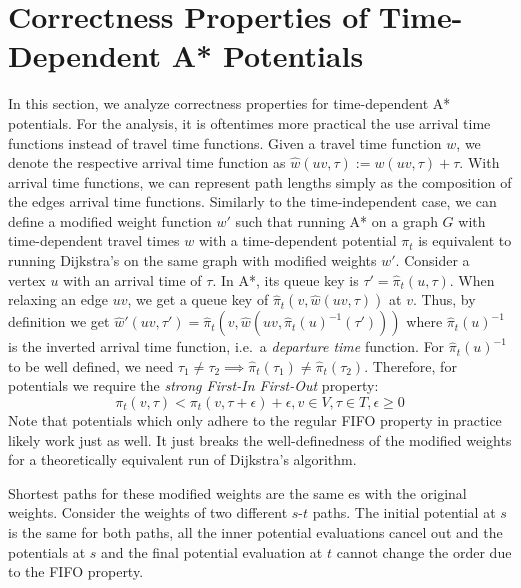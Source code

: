 \documentclass[a4paper,UKenglish,cleveref, autoref, thm-restate,anonymous]{lipics-v2021}
\begin{document}
\section{Correctness Properties of Time-Dependent A* Potentials}\label{sec:appendix:correctness}

In this section, we analyze correctness properties for time-dependent A* potentials.
For the analysis, it is oftentimes more practical the use arrival time functions instead of travel time functions.
Given a travel time function $w$, we denote the respective arrival time function as $\hat{w}(uv, \tau) := w(uv, \tau) + \tau$.
With arrival time functions, we can represent path lengths simply as the composition of the edges arrival time functions.
Similarly to the time-independent case, we can define a modified weight function $w'$ such that running A* on a graph $G$ with time-dependent travel times $w$ with a time-dependent potential $\pi_t$ is equivalent to running Dijkstra's on the same graph with modified weights $w'$.
Consider a vertex $u$ with an arrival time of $\tau$.
In A*, its queue key is $\tau' = \hat{\pi}_t(u, \tau)$.
When relaxing an edge $uv$, we get a queue key of $\hat{\pi}_t(v, \hat{w}(uv, \tau))$ at $v$.
Thus, by definition we get $\hat{w}'(uv, \tau') = \hat{\pi}_t(v, \hat{w}(uv, \hat{\pi}_t(u)^{-1}(\tau')))$ where $\hat{\pi}_t(u)^{-1}$ is the inverted arrival time function, i.e.\ a \emph{departure time} function.
For $\hat{\pi}_t(u)^{-1}$ to be well defined, we need $\tau_1 \neq \tau_2 \implies \hat{\pi}_t(\tau_1) \neq \hat{\pi}_t(\tau_2)$.
Therefore, for potentials we require the \emph{strong First-In First-Out} property:
\[
\pi_t(v, \tau) < \pi_t(v, \tau + \epsilon) + \epsilon, v \in V, \tau \in T, \epsilon \geq 0
\]
Note that potentials which only adhere to the regular FIFO property in practice likely work just as well.
It just breaks the well-definedness of the modified weights for a theoretically equivalent run of Dijkstra's algorithm.

Shortest paths for these modified weights are the same es with the original weights.
Consider the weights of two different $s$-$t$ paths.
The initial potential at $s$ is the same for both paths, all the inner potential evaluations cancel out and the potentials at $s$ and the final potential evaluation at $t$ cannot change the order due to the FIFO property.
\end{document}
